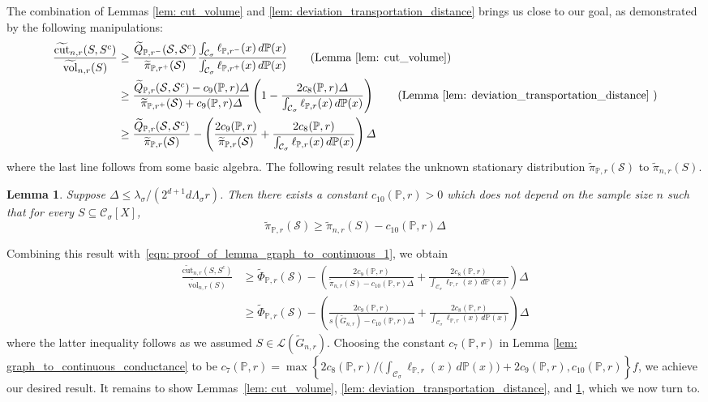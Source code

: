 \documentclass[11pt,twoside]{article}
\newtheorem{lemma}{Lemma}
\newcommand{\set}[1]{\left\{#1\right\}}
\newcommand{\vol}{\mathrm{vol}}
\newcommand{\cut}{\mathrm{cut}}
\newcommand{\1}{\mathbf{1}}
\newcommand{\Xbf}{X}             %
\newcommand{\Pbb}{\mathbb{P}}
\newcommand{\Sset}{\mathcal{S}}
\newcommand{\Cset}{\mathcal{C}}
\newcommand{\Csig}{\Cset_{\sigma}}
\begin{document}
The combination of Lemmas \ref{lem: cut_volume} and \ref{lem: deviation_transportation_distance} brings us close to our goal, as demonstrated by the following manipulations:
\begin{align}
\frac{\widetilde{\cut}_{n,r}(S,S^c)}{\widetilde{\vol}_{n,r}(S)} & \geq \frac{\widetilde{Q}_{\Pbb,r^-}(\Sset,\Sset^c)}{\widetilde{\pi}_{\Pbb,r^+}(\Sset)} \frac{\int_{\Csig} \ell_{\Pbb,r^-}(x) \,d\Pbb(x)}{\int_{\Csig} \ell_{\Pbb,r^+}(x) \,d\Pbb(x)} \tag{Lemma \ref{lem: cut_volume}} \\
& \geq \frac{\widetilde{Q}_{\Pbb,r}(\Sset,\Sset^c) - c_9(\Pbb,r) \varDelta }{\widetilde{\pi}_{\Pbb,r^+}(\Sset) + c_9(\Pbb,r) \varDelta} \left(1 - \frac{2 c_8(\Pbb,r) \varDelta}{\int_{\Csig}\ell_{\Pbb,r}(x)\,d\Pbb(x)}\right) \tag{Lemma \ref{lem: deviation_transportation_distance} } \\
& \geq \frac{\widetilde{Q}_{\Pbb,r}(\Sset,\Sset^c)}{\widetilde{\pi}_{\Pbb,r}(\Sset)} - \left(\frac{2c_9(\Pbb,r)}{\widetilde{\pi}_{\Pbb,r}(\Sset)} + \frac{2c_8(\Pbb,r)}{\int_{\Csig}\ell_{\Pbb,r}(x)\,d\Pbb(x)}\right)\varDelta \label{eqn: proof_of_lemma_graph_to_continuous_1}
\end{align}
where the last line follows from some basic algebra. The following result relates the unknown stationary distribution $\widetilde{\pi}_{\Pbb,r}(\Sset)$ to $\widetilde{\pi}_{n,r}(S)$.
\begin{lemma}
	\label{lem: continuous_pi_lb}
	Suppose $\varDelta \leq \lambda_{\sigma}/(2^{d+1}d\Lambda_{\sigma}r)$. Then there exists a constant $c_{10}(\Pbb,r) > 0$ which does not depend on the sample size $n$ such that for every $S \subseteq \Csig[\Xbf]$,
	\begin{equation*}
	\widetilde{\pi}_{\Pbb,r}(\Sset) \geq \widetilde{\pi}_{n,r}(S) - c_{10}(\Pbb,r) \varDelta
	\end{equation*}
\end{lemma}
Combining this result with~\eqref{eqn: proof_of_lemma_graph_to_continuous_1}, we obtain
\begin{align*}
\frac{\widetilde{\cut}_{n,r}(S,S^c)}{\widetilde{\vol}_{n,r}(S)} & \geq \widetilde{\Phi}_{\Pbb,r}(\Sset) - \left(\frac{2c_9(\Pbb,r)}{\widetilde{\pi}_{n,r}(S) - c_{10}(\Pbb,r)\varDelta} + \frac{2c_8(\Pbb,r)}{\int_{\Csig}\ell_{\Pbb,r}(x)\,d\Pbb(x)}\right)\varDelta \\
& \geq \widetilde{\Phi}_{\Pbb,r}(\Sset) - \left(\frac{2c_9(\Pbb,r)}{s(\widetilde{G}_{n,r}) - c_{10}(\Pbb,r)\varDelta} + \frac{2c_8(\Pbb,r)}{\int_{\Csig}\ell_{\Pbb,r}(x)\,d\Pbb(x)}\right)\varDelta
\end{align*}
where the latter inequality follows as we assumed $S \in \mathcal{L}(\widetilde{G}_{n,r})$. Choosing the constant $c_7(\Pbb,r)$ in Lemma \ref{lem: graph_to_continuous_conductance} to be $c_7(\Pbb,r) = \max\set{2c_8(\Pbb,r)/\bigl(\int_{\Csig}\ell_{\Pbb,r}(x)\,d\Pbb(x) \bigr) + 2c_9(\Pbb,r), c_{10}(\Pbb,r)}f$, we achieve our desired result. It remains to show Lemmas~\ref{lem: cut_volume}, \ref{lem: deviation_transportation_distance}, and \ref{lem: continuous_pi_lb}, which we now turn to.
\end{document}

